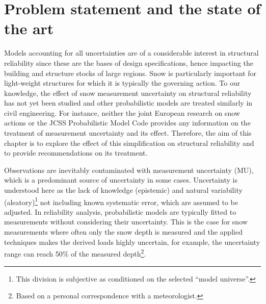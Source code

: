 \leftskip=0pt\rightskip=0pt

\section{Problem statement and the state of the art}

Models accounting for all uncertainties are of a considerable interest in structural reliability since these are the bases of design specifications, hence impacting the building and structure stocks of large regions. Snow is particularly important for light-weight structures for which it is typically the governing action. To our knowledge, the effect of snow measurement uncertainty on structural reliability has not yet been studied and other probabilistic models are treated similarly in civil engineering. For instance, neither the joint European research on snow actions \citep{Sanpaolesi1998} or the JCSS Probabilistic Model Code \citep{JCSS_basis} provides any information on the treatment of measurement uncertainty and its effect. Therefore, the aim of this chapter is to explore the effect of this simplification on structural reliability and to provide recommendations on its treatment.

Observations are inevitably contaminated with measurement uncertainty (MU), which is a predominant source of uncertainty in some cases. Uncertainty is understood here as the lack of knowledge (epistemic) and natural variability (aleatory)\footnote{This division is subjective as conditioned on the selected ``model universe''.}  not including known systematic error, which are assumed to be adjusted. In reliability analysis, probabilistic models are typically fitted to measurements without considering their uncertainty. This is the case for snow measurements where often only the snow depth is measured and the applied techniques makes the derived loads highly uncertain, for example, the uncertainty range can reach 50\% of the measured depth\footnote{Based on a personal correspondence with a meteorologist.}. 

